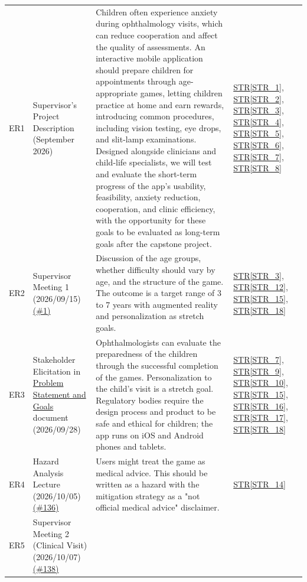 \documentclass[10pt]{article}
\newcommand{\strref}[1]{\hyperref[#1]{STR\ref*{#1}}}
\begin{document}
\begin{longtable}{@{}p{} >{\raggedright\arraybackslash}p{} >{\raggedright\arraybackslash}p{} >{\raggedright\arraybackslash}p{}@{}}
ER1\label{ER1}
& Supervisor's Project Description (September 2026)
& Children often experience anxiety during ophthalmology visits, 
which can reduce cooperation and affect the quality of assessments. 
An interactive mobile application should prepare children for 
appointments through age-appropriate games, letting children practice 
at home and earn rewards, introducing common procedures, including 
vision testing, eye drops, and slit-lamp examinations. Designed alongside 
clinicians and child-life specialists, we will test and evaluate the 
short-term progress of the app's usability, feasibility, anxiety reduction, 
cooperation, and clinic efficiency, with the opportunity for these goals to
be evaluated as long-term goals after the capstone project.
& \strref{STR_1}, \strref{STR_2}, \strref{STR_3},
\strref{STR_4}, \strref{STR_5}, \strref{STR_6},
\strref{STR_7}, \strref{STR_8} \\
ER2\label{ER2}
& Supervisor Meeting 1 (2026/09/15) \href{https://github.com/team-hindsight/ophthamology-game/issues/1}{(\#1)}
& Discussion of the age groups, whether
difficulty should vary by age, and the
structure of the game. The outcome is a target range of 
3 to 7 years with augmented 
reality and personalization as stretch goals.
& \strref{STR_3}, \strref{STR_12}, \strref{STR_15},
\strref{STR_18} \\
ER3\label{ER3}
& Stakeholder Elicitation in \href{https://team-hindsight.github.io/ophthamology-game/ProblemStatementAndGoals/ProblemStatement.pdf}{Problem Statement and Goals} document (2026/09/28)
& Ophthalmologists can evaluate the preparedness of the children through 
the successful completion of the games. Personalization to the child's visit 
is a stretch goal. Regulatory bodies require the design process and product 
to be safe and ethical for children; the app runs on iOS and Android phones 
and tablets.
& \strref{STR_7}, \strref{STR_9}, \strref{STR_10},
\strref{STR_15}, \strref{STR_16}, \strref{STR_17},
\strref{STR_18} \\
ER4\label{ER4}
& Hazard Analysis Lecture (2026/10/05) \href{https://github.com/team-hindsight/ophthamology-game/issues/136}{(\#136)}
& Users might treat the game as medical
advice. This should be written as a hazard with the mitigation strategy as a 
"not official medical advice" disclaimer.
& \strref{STR_14} \\
ER5\label{ER5}
& Supervisor Meeting 2 (Clinical Visit) (2026/10/07) \href{https://github.com/team-hindsight/ophthamology-game/issues/138}{(\#138)}

\end{longtable}
\end{document}
